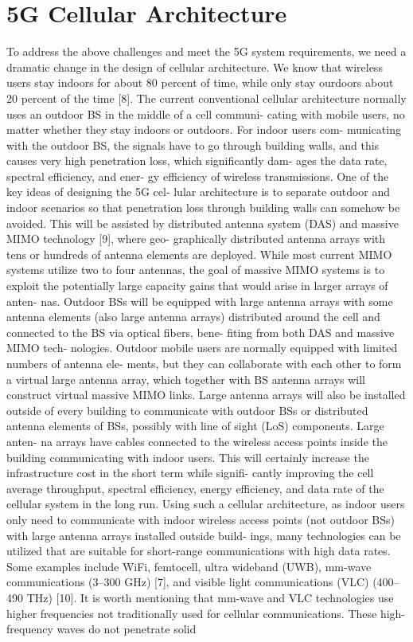 \section{5G Cellular Architecture}





To address the above challenges and meet the 5G system requirements, we need a dramatic change in the design of cellular architecture. We know that wireless users stay indoors for about 80 percent of time, while only stay ourdoors about 20 percent of the time [8]. The current conventional cellular architecture normally uses an outdoor BS in the middle of a cell communi- cating with mobile users, no matter whether they stay indoors or outdoors. For indoor users com- municating with the outdoor BS, the signals have to go through building walls, and this causes very high penetration loss, which significantly dam- ages the data rate, spectral efficiency, and ener- gy efficiency of wireless transmissions. One of the key ideas of designing the 5G cel- lular architecture is to separate outdoor and indoor scenarios so that penetration loss through building walls can somehow be avoided. This will be assisted by distributed antenna system (DAS) and massive MIMO technology [9], where geo- graphically distributed antenna arrays with tens or hundreds of antenna elements are deployed. While most current MIMO systems utilize two to four antennas, the goal of massive MIMO systems is to exploit the potentially large capacity gains that would arise in larger arrays of anten- nas. Outdoor BSs will be equipped with large antenna arrays with some antenna elements (also large antenna arrays) distributed around the cell and connected to the BS via optical fibers, bene- fiting from both DAS and massive MIMO tech- nologies. Outdoor mobile users are normally equipped with limited numbers of antenna ele- ments, but they can collaborate with each other to form a virtual large antenna array, which together with BS antenna arrays will construct virtual massive MIMO links. Large antenna arrays will also be installed outside of every building to communicate with outdoor BSs or distributed antenna elements of BSs, possibly with line of sight (LoS) components. Large anten- na arrays have cables connected to the wireless access points inside the building communicating with indoor users. This will certainly increase the infrastructure cost in the short term while signifi- cantly improving the cell average throughput, spectral efficiency, energy efficiency, and data rate of the cellular system in the long run. Using such a cellular architecture, as indoor users only need to communicate with indoor wireless access points (not outdoor BSs) with large antenna arrays installed outside build- ings, many technologies can be utilized that are suitable for short-range communications with high data rates. Some examples include WiFi, femtocell, ultra wideband (UWB), mm-wave communications (3–300 GHz) [7], and visible light communications (VLC) (400–490 THz) [10]. It is worth mentioning that mm-wave and VLC technologies use higher frequencies not traditionally used for cellular communications. These high-frequency waves do not penetrate solid 